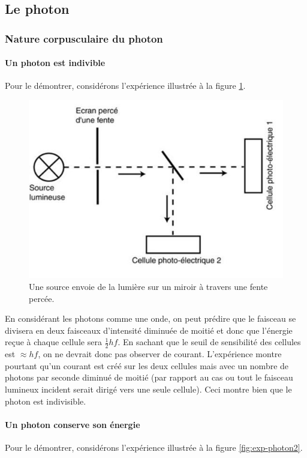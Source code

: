 \subsection{Le photon}
\subsubsection{Nature corpusculaire du photon}
\paragraph{Un photon est indivible}
Pour le démontrer, considérons
l'expérience illustrée à la figure \ref{fig:exp-photon1}.

\begin{figure}[ht!]
	\centering
	\includegraphics[scale=0.5]{exp_photon_1.jpg}
	\caption{Une source envoie de la lumière sur un miroir
	à travers une fente percée.}
	\label{fig:exp-photon1}
\end{figure}

En considérant les photons comme une onde, on peut prédire
que le faisceau se divisera en deux faisceaux d'intensité diminuée
de moitié et donc que l'énergie reçue à chaque cellule sera $\frac{1}{2}hf$.
En sachant que le seuil de sensibilité des cellules est $\approx hf$,
on ne devrait donc pas observer de courant. L'expérience
montre pourtant qu'un courant est créé sur les deux cellules mais
avec un nombre de photons par seconde diminué de moitié (par rapport
au cas ou tout le faisceau lumineux incident serait dirigé vers une seule
cellule). Ceci montre bien que le photon est indivisible.

\paragraph{Un photon conserve son énergie}
Pour le démontrer, considérons l'expérience illustrée
à la figure \ref{fig:exp-photon2}.


